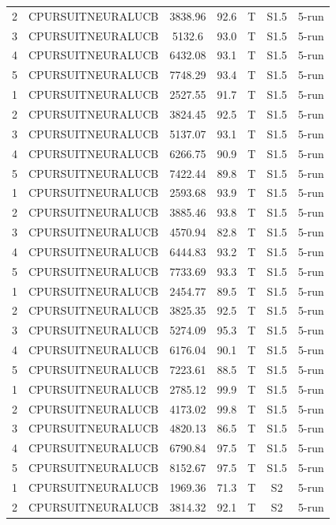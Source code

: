 \documentclass[11pt]{article}
\begin{document}
\begin{center}
\begin{longtable}{|c|c|c|c|c|c|c|}
2 & CPURSUITNEURALUCB & 3838.96 & 92.6 & T & S1.5 & 5-run \\
3 & CPURSUITNEURALUCB & 5132.6 & 93.0 & T & S1.5 & 5-run \\
4 & CPURSUITNEURALUCB & 6432.08 & 93.1 & T & S1.5 & 5-run \\
5 & CPURSUITNEURALUCB & 7748.29 & 93.4 & T & S1.5 & 5-run \\
1 & CPURSUITNEURALUCB & 2527.55 & 91.7 & T & S1.5 & 5-run \\
2 & CPURSUITNEURALUCB & 3824.45 & 92.5 & T & S1.5 & 5-run \\
3 & CPURSUITNEURALUCB & 5137.07 & 93.1 & T & S1.5 & 5-run \\
4 & CPURSUITNEURALUCB & 6266.75 & 90.9 & T & S1.5 & 5-run \\
5 & CPURSUITNEURALUCB & 7422.44 & 89.8 & T & S1.5 & 5-run \\
1 & CPURSUITNEURALUCB & 2593.68 & 93.9 & T & S1.5 & 5-run \\
2 & CPURSUITNEURALUCB & 3885.46 & 93.8 & T & S1.5 & 5-run \\
3 & CPURSUITNEURALUCB & 4570.94 & 82.8 & T & S1.5 & 5-run \\
4 & CPURSUITNEURALUCB & 6444.83 & 93.2 & T & S1.5 & 5-run \\
5 & CPURSUITNEURALUCB & 7733.69 & 93.3 & T & S1.5 & 5-run \\
1 & CPURSUITNEURALUCB & 2454.77 & 89.5 & T & S1.5 & 5-run \\
2 & CPURSUITNEURALUCB & 3825.35 & 92.5 & T & S1.5 & 5-run \\
3 & CPURSUITNEURALUCB & 5274.09 & 95.3 & T & S1.5 & 5-run \\
4 & CPURSUITNEURALUCB & 6176.04 & 90.1 & T & S1.5 & 5-run \\
5 & CPURSUITNEURALUCB & 7223.61 & 88.5 & T & S1.5 & 5-run \\
1 & CPURSUITNEURALUCB & 2785.12 & 99.9 & T & S1.5 & 5-run \\
2 & CPURSUITNEURALUCB & 4173.02 & 99.8 & T & S1.5 & 5-run \\
3 & CPURSUITNEURALUCB & 4820.13 & 86.5 & T & S1.5 & 5-run \\
4 & CPURSUITNEURALUCB & 6790.84 & 97.5 & T & S1.5 & 5-run \\
5 & CPURSUITNEURALUCB & 8152.67 & 97.5 & T & S1.5 & 5-run \\
1 & CPURSUITNEURALUCB & 1969.36 & 71.3 & T & S2 & 5-run \\
2 & CPURSUITNEURALUCB & 3814.32 & 92.1 & T & S2 & 5-run \\

\end{longtable}
\end{center}
\end{document}
